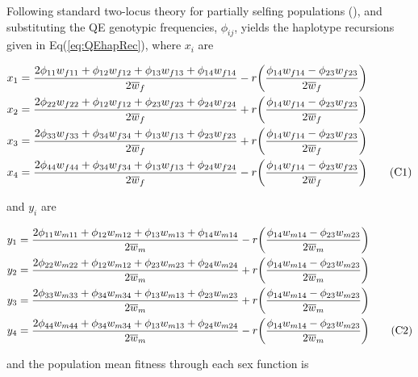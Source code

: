 \documentclass{article}
\newcommand\numberthis{\addtocounter{equation}{1}\tag{\theequation}}
\begin{document}
Following standard two-locus theory for partially selfing populations (\citealt{Holden1979, OttoDay2007, JordanConn2014}), and substituting the QE genotypic frequencies, $\phi_{ij}$, yields the haplotype recursions given in Eq(\ref{eq:QEhapRec}), where $x_{i}$ are

\begin{align*}
	x_1 &= \frac{2 \phi_{11} w_{f11} + \phi_{12} w_{f12} + \phi_{13} w_{f13} + \phi_{14} w_{f14}}{2 \overline{w}_f} -
				r \bigg( \frac{\phi_{14} w_{f14} - \phi_{23} w_{f23}} {2 \overline{w}_f} \bigg) \\
	x_2 &= \frac{2 \phi_{22} w_{f22} + \phi_{12} w_{f12} + \phi_{23} w_{f23} + \phi_{24} w_{f24}}{2 \overline{w}_f} +
				r \bigg( \frac{\phi_{14} w_{f14} - \phi_{23} w_{f23}} {2 \overline{w}_f} \bigg) \\ 
	x_3 &= \frac{2 \phi_{33} w_{f33} + \phi_{34} w_{f34} + \phi_{13} w_{f13} + \phi_{23} w_{f23}}{2 \overline{w}_f} +
				r \bigg( \frac{\phi_{14} w_{f14} - \phi_{23} w_{f23}} {2 \overline{w}_f} \bigg) \\
	x_4 &= \frac{2 \phi_{44} w_{f44} + \phi_{34} w_{f34} + \phi_{13} w_{f13} + \phi_{24} w_{f24}}{2 \overline{w}_f} -
				r \bigg( \frac{\phi_{14} w_{f14} - \phi_{23} w_{f23}} {2 \overline{w}_f} \bigg) \numberthis
\end{align*}

\noindent{} and $y_{i}$ are

\begin{align*}
	y_1 &= \frac{2 \phi_{11} w_{m11} + \phi_{12} w_{m12} + \phi_{13} w_{m13} + \phi_{14} w_{m14}}{2 \overline{w}_m} -
				r \bigg( \frac{\phi_{14} w_{m14} - \phi_{23} w_{m23}} {2 \overline{w}_m} \bigg) \\
	y_2 &= \frac{2 \phi_{22} w_{m22} + \phi_{12} w_{m12} + \phi_{23} w_{m23} + \phi_{24} w_{m24}}{2 \overline{w}_m} +
				r \bigg( \frac{\phi_{14} w_{m14} - \phi_{23} w_{m23}} {2 \overline{w}_m} \bigg) \\
	y_3 &= \frac{2 \phi_{33} w_{m33} + \phi_{34} w_{m34} + \phi_{13} w_{m13} + \phi_{23} w_{m23}}{2 \overline{w}_m} +
				r \bigg( \frac{\phi_{14} w_{m14} - \phi_{23} w_{m23}} {2 \overline{w}_m} \bigg) \\
	y_4 &= \frac{2 \phi_{44} w_{m44} + \phi_{34} w_{m34} + \phi_{13} w_{m13} + \phi_{24} w_{m24}}{2 \overline{w}_m} -
				r \bigg( \frac{\phi_{14} w_{m14} - \phi_{23} w_{m23}} {2 \overline{w}_m} \bigg) \numberthis
\end{align*}

\noindent{} and the population mean fitness through each sex function is
\end{document}
